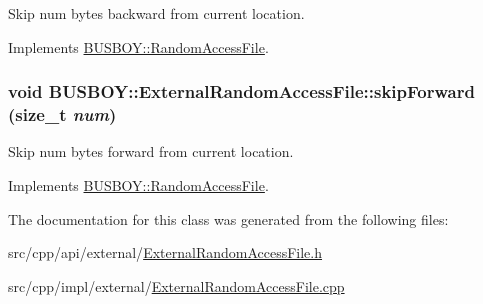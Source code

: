 Skip num bytes backward from current location. 

Implements \hyperlink{classBUSBOY_1_1RandomAccessFile_a9026d72b47b570f79318839107068420}{BUSBOY::RandomAccessFile}.\hypertarget{classBUSBOY_1_1ExternalRandomAccessFile_a58a36479f064e4748302f256bde83519}{
\subsubsection[{skipForward}]{\setlength{\rightskip}{0pt plus 5cm}void BUSBOY::ExternalRandomAccessFile::skipForward (size\_\-t {\em num})}}
\label{classBUSBOY_1_1ExternalRandomAccessFile_a58a36479f064e4748302f256bde83519}


Skip num bytes forward from current location. 

Implements \hyperlink{classBUSBOY_1_1RandomAccessFile_a45010d12ee4e8c98f5e71273bdf32cf3}{BUSBOY::RandomAccessFile}.

The documentation for this class was generated from the following files:\begin{DoxyCompactItemize}
\item 
src/cpp/api/external/\hyperlink{ExternalRandomAccessFile_8h}{ExternalRandomAccessFile.h}\item 
src/cpp/impl/external/\hyperlink{ExternalRandomAccessFile_8cpp}{ExternalRandomAccessFile.cpp}\end{DoxyCompactItemize}
